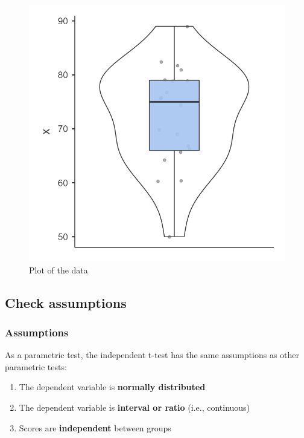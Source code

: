 \documentclass[
]{book}
\begin{document}
\begin{figure}

{\centering \includegraphics[width=0.8\linewidth]{images/07.1-one_sample_t-test/plot} 

}

\caption{Plot of the data}\label{fig:unnamed-chunk-3}
\end{figure}

\hypertarget{check-assumptions}{%
\subsection{Check assumptions}\label{check-assumptions}}

\hypertarget{assumptions}{%
\subsubsection{Assumptions}\label{assumptions}}

As a parametric test, the independent t-test has the same assumptions as other parametric tests:

\begin{enumerate}
\def\labelenumi{\arabic{enumi}.}
\item
  The dependent variable is \textbf{normally distributed}
\item
  The dependent variable is \textbf{interval or ratio} (i.e., continuous)
\item
  Scores are \textbf{independent} between groups
\end{enumerate}
\end{document}
